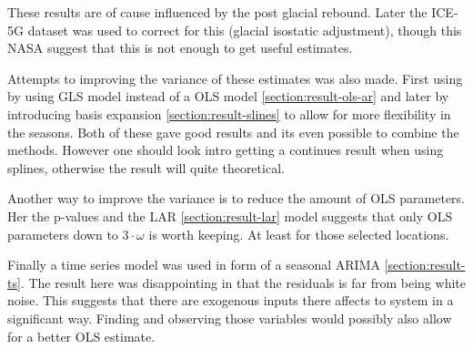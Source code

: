 These results are of cause influenced by the post glacial rebound. Later the ICE-5G dataset was  used to correct for this (glacial isostatic adjustment), though this NASA \cite{nasa-gia-incomplete} suggest that this is not enough to get useful estimates.

Attempts to improving the variance of these estimates was also made. First using by using GLS model instead of a OLS model \ref{section:result-ols-ar} and later by introducing basis expansion \ref{section:result-slines} to allow for more flexibility in the seasons. Both of these gave good results and its even possible to combine the methods. However one should look intro getting a continues result when using splines, otherwise the result will quite theoretical.

Another way to improve the variance is to reduce the amount of OLS parameters. Her the p-values and the LAR \ref{section:result-lar} model suggests that only OLS parameters down to $3 \cdot \omega$ is worth keeping. At least for those selected locations.

Finally a time series model was used in form of a seasonal ARIMA \ref{section:result-ts}. The result here was disappointing in that the residuals is far from being white noise. This suggests that there are exogenous inputs there affects to system in a significant way. Finding and observing those variables would possibly also allow for a better OLS estimate. 
